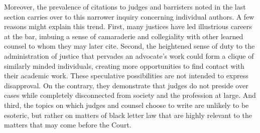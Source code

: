 Moreover, the prevalence of citations to judges and barristers noted in the last section carries over to this narrower inquiry concerning individual authors. A few reasons might explain this trend. First, many justices have led illustrious careers at the bar, imbuing a sense of camaraderie and collegiality with other learned counsel to whom they may later cite. Second, the heightened sense of duty to the administration of justice that pervades an advocate's work could form a clique of similarly minded individuals, creating more opportunities to find contact with their academic work. These speculative possibilities are not intended to express disapproval. On the contrary, they demonstrate that judges do not preside over cases while completely disconnected from society and the profession at large.\xn{} And third, the topics on which judges and counsel choose to write are unlikely to be esoteric, but rather on matters of black letter law that are highly relevant to the matters that may come before the Court.
